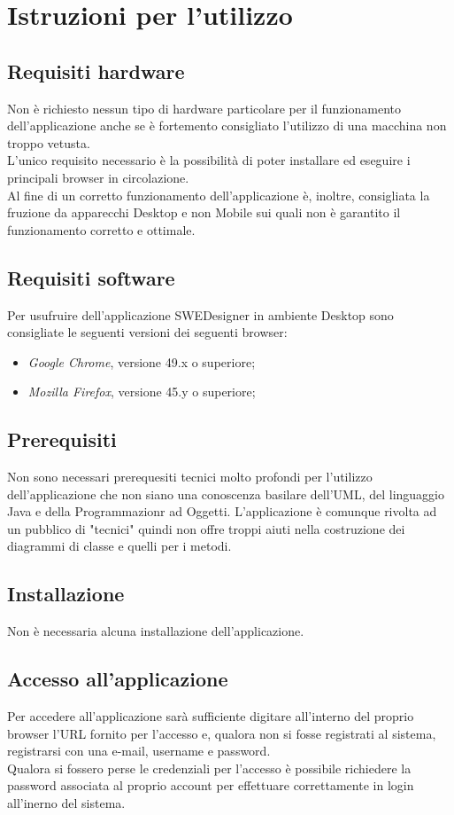 \section{Istruzioni per l'utilizzo}
\subsection{Requisiti hardware}
Non è richiesto nessun tipo di hardware particolare per il funzionamento dell'applicazione anche se è fortemento consigliato
l'utilizzo di una macchina non troppo vetusta.\\
L'unico requisito necessario è la possibilità di poter installare ed eseguire i principali browser in circolazione.\\
Al fine di un corretto funzionamento dell'applicazione è, inoltre, consigliata la fruzione da apparecchi Desktop e non Mobile sui quali non è
garantito il funzionamento corretto e ottimale.

\subsection{Requisiti software}
Per usufruire dell'applicazione SWEDesigner in ambiente Desktop sono consigliate le seguenti versioni dei seguenti browser:
\begin{itemize}
\item \emph{Google Chrome}, versione 49.x o superiore;
\item \emph{Mozilla Firefox}, versione 45.y o superiore;
\end{itemize}

\subsection{Prerequisiti}
Non sono necessari prerequesiti tecnici molto profondi per l'utilizzo dell'applicazione che non siano una conoscenza basilare dell'UML, del linguaggio Java e della Programmazionr ad Oggetti.
L'applicazione è comunque rivolta ad un pubblico di "tecnici" quindi non offre troppi aiuti nella costruzione dei diagrammi di classe e quelli per i metodi.

\subsection{Installazione}
Non è necessaria alcuna installazione dell'applicazione.

\subsection{Accesso all'applicazione}
Per accedere all'applicazione sarà sufficiente digitare all'interno del proprio browser l'URL fornito per l'accesso e, qualora non si fosse registrati al sistema, registrarsi con una e-mail, username e password.\\
Qualora si fossero perse le credenziali per l'accesso è possibile richiedere la password associata al proprio account per effettuare correttamente in login all'inerno del sistema.

